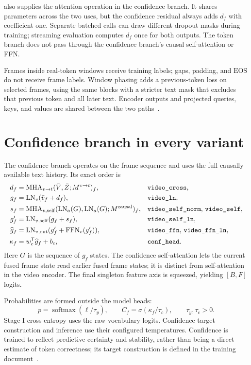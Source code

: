 \documentclass[11pt,a4paper]{article}
\newcommand{\LN}{\operatorname{LN}}
\newcommand{\MHA}{\operatorname{MHA}}
\newcommand{\FFN}{\operatorname{FFN}}
\newcommand{\softmax}{\operatorname{softmax}}
\newcommand{\EOS}{\ensuremath{\mathrm{EOS}}}
\newcommand{\code}[1]{\texttt{\detokenize{#1}}}
\numberwithin{equation}{section}
\begin{document}
\code{video_cross} also supplies the attention operation in the
confidence branch. It shares parameters across the two uses, but the
confidence residual always adds $d_f$ with coefficient one. Separate
batched calls can draw different dropout masks during training; streaming
evaluation computes $d_f$ once for both outputs. The token branch does
not pass through the confidence branch's causal self-attention or FFN.

Frames inside real-token windows receive training labels; gaps, padding,
and \EOS{} do not receive frame labels. Window phasing adds a previous-token
loss on selected frames, using the same blocks with a stricter text mask that
excludes that previous token and all later text. Encoder outputs and projected
queries, keys, and values are shared between the two paths~\cite{training}.

\section{Confidence branch in every variant}
\label{sec:confidence}

The confidence branch operates on the frame sequence and uses the
full causally available text history. Its exact order is
\begin{align}
d_f&=\MHA_{v\to t}(\bar V,\bar Z;M^{v\to t})_f,
 &&\text{\code{video_cross}},\\
g_f&=\LN_v(\bar v_f+d_f),
 &&\text{\code{video_ln}},\\
s_f&=\MHA_{v,\rm self}(\LN_a(G),\LN_a(G);M^{\rm causal})_f,
 &&\text{\code{video_self_norm}, \code{video_self}},\\
g'_f&=\LN_{v,\rm self}(g_f+s_f),
 &&\text{\code{video_self_ln}},\\
\widehat g_f&=\LN_{v,\rm out}(g'_f+\FFN_v(g'_f)),
 &&\text{\code{video_ffn}, \code{video_ffn_ln}},\\
\kappa_f&=w_c^{\mathsf T}\widehat g_f+b_c,
 &&\text{\code{conf_head}}.
\label{eq:confidence-path}
\end{align}
Here $G$ is the sequence of $g_f$ states. The confidence self-attention
lets the current fused frame state read earlier fused frame states;
it is distinct from self-attention in the video encoder. The final
singleton feature axis is squeezed, yielding $[B,F]$ logits.

Probabilities are formed outside the model heads:
\begin{equation}
p=\softmax(\ell/\tau_y),\qquad C_f=\sigma(\kappa_f/\tau_c),
\qquad \tau_y,\tau_c>0.
\end{equation}
Stage-I cross entropy uses the raw vocabulary logits. Confidence-target
construction and inference use their configured temperatures. Confidence
is trained to reflect predictive certainty and stability, rather than
being a direct estimate of token correctness; its target construction
is defined in the training document~\cite{training}.
\end{document}
